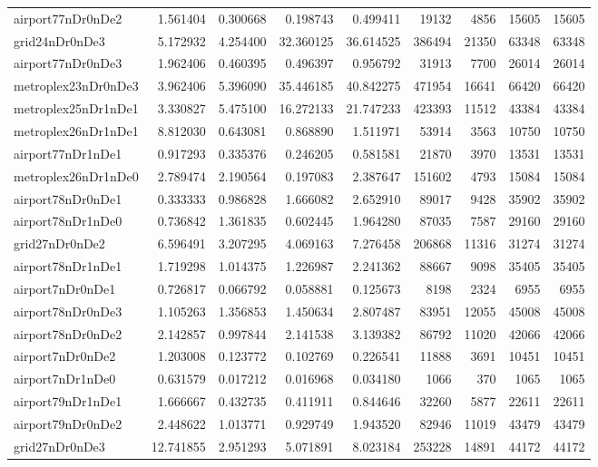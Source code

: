 \begin{longtable}{|l|r|r|r|r|r|r|r|r|}
airport77nDr0nDe2 & 1.561404 & 0.300668 & 0.198743 & 0.499411 & 19132 & 4856 & 15605 & 15605 \\
grid24nDr0nDe3 & 5.172932 & 4.254400 & 32.360125 & 36.614525 & 386494 & 21350 & 63348 & 63348 \\
airport77nDr0nDe3 & 1.962406 & 0.460395 & 0.496397 & 0.956792 & 31913 & 7700 & 26014 & 26014 \\
metroplex23nDr0nDe3 & 3.962406 & 5.396090 & 35.446185 & 40.842275 & 471954 & 16641 & 66420 & 66420 \\
metroplex25nDr1nDe1 & 3.330827 & 5.475100 & 16.272133 & 21.747233 & 423393 & 11512 & 43384 & 43384 \\
metroplex26nDr1nDe1 & 8.812030 & 0.643081 & 0.868890 & 1.511971 & 53914 & 3563 & 10750 & 10750 \\
airport77nDr1nDe1 & 0.917293 & 0.335376 & 0.246205 & 0.581581 & 21870 & 3970 & 13531 & 13531 \\
metroplex26nDr1nDe0 & 2.789474 & 2.190564 & 0.197083 & 2.387647 & 151602 & 4793 & 15084 & 15084 \\
airport78nDr0nDe1 & 0.333333 & 0.986828 & 1.666082 & 2.652910 & 89017 & 9428 & 35902 & 35902 \\
airport78nDr1nDe0 & 0.736842 & 1.361835 & 0.602445 & 1.964280 & 87035 & 7587 & 29160 & 29160 \\
grid27nDr0nDe2 & 6.596491 & 3.207295 & 4.069163 & 7.276458 & 206868 & 11316 & 31274 & 31274 \\
airport78nDr1nDe1 & 1.719298 & 1.014375 & 1.226987 & 2.241362 & 88667 & 9098 & 35405 & 35405 \\
airport7nDr0nDe1 & 0.726817 & 0.066792 & 0.058881 & 0.125673 & 8198 & 2324 & 6955 & 6955 \\
airport78nDr0nDe3 & 1.105263 & 1.356853 & 1.450634 & 2.807487 & 83951 & 12055 & 45008 & 45008 \\
airport78nDr0nDe2 & 2.142857 & 0.997844 & 2.141538 & 3.139382 & 86792 & 11020 & 42066 & 42066 \\
airport7nDr0nDe2 & 1.203008 & 0.123772 & 0.102769 & 0.226541 & 11888 & 3691 & 10451 & 10451 \\
airport7nDr1nDe0 & 0.631579 & 0.017212 & 0.016968 & 0.034180 & 1066 & 370 & 1065 & 1065 \\
airport79nDr1nDe1 & 1.666667 & 0.432735 & 0.411911 & 0.844646 & 32260 & 5877 & 22611 & 22611 \\
airport79nDr0nDe2 & 2.448622 & 1.013771 & 0.929749 & 1.943520 & 82946 & 11019 & 43479 & 43479 \\
grid27nDr0nDe3 & 12.741855 & 2.951293 & 5.071891 & 8.023184 & 253228 & 14891 & 44172 & 44172 \\

\end{longtable}
